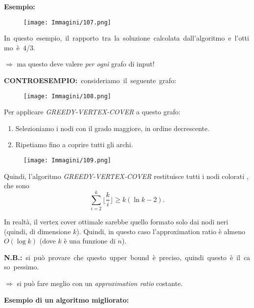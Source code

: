 \documentclass{article}
\begin{document}
\textbf{Esempio:}

\begin{figure}[H]
    \centering
    \texttt{[image: Immagini/107.png]}
    \label{algo_vertex_cover-example}
\end{figure}

\hbox{In questo esempio, il rapporto tra la soluzione calcolata dall'algoritmo e l'ottimo è 4/3.}

$\Rightarrow$ ma questo deve valere \textit{per ogni} grafo di input!

\text{}
\newline
\hbox{\textbf{CONTROESEMPIO:} consideriamo il seguente grafo:}

\begin{figure}[H]
    \centering
    \texttt{[image: Immagini/108.png]}
    \label{fig:controesempio}
\end{figure}

Per applicare \textit{GREEDY-VERTEX-COVER} a questo grafo:
\begin{enumerate}
    \item Selezioniamo i nodi con il grado maggiore, in ordine decrescente.
    \item Ripetiamo fino a coprire tutti gli archi.
\end{enumerate}

\begin{figure}[H]
    \centering
    \texttt{[image: Immagini/109.png]}
    \label{fig:example_image}
\end{figure}

Quindi, l'algoritmo \textit{GREEDY-VERTEX-COVER} restituisce tutti i nodi colorati , che sono
$$
\sum_{i=2}^{k} \lfloor \frac{k}{i} \rfloor \geq k(\ln k - 2).
$$

\text{}
\newline
In realtà, il vertex cover ottimale sarebbe quello formato solo dai nodi neri (quindi, di dimensione $k$).
\newline
Quindi, in questo caso l'approximation ratio è almeno $O(\log k)$ (dove $k$ è una funzione di $n$).
\vspace{1em}

\hbox{\textbf{N.B.:} si può provare che questo upper bound è preciso, quindi questo è il caso pessimo.}
\vspace{1em}

$\Rightarrow$ si può fare meglio con un \textit{approximation ratio} costante.

\textbf{Esempio di un algoritmo migliorato:}
\end{document}
